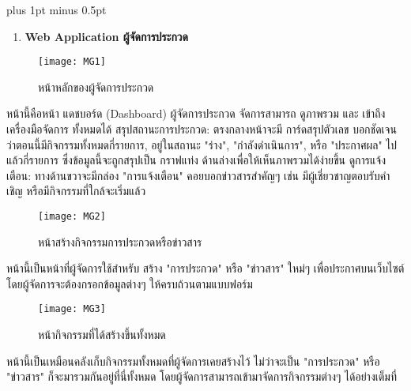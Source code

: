
\clearpage
\thispagestyle{plain}

\begingroup
\fontsize{16pt}{19.2pt}\selectfont
\justifying
\XeTeXlinebreakskip=0pt plus 1pt minus 0.5pt
\setlength{\parindent}{1.5cm}
\setlength{\parskip}{0pt}

\begin{sloppypar}
	\begin{enumerate}[start=4]  %
		\item \textbf{Web Application ผู้จัดการประกวด}
	\end{enumerate}
\end{sloppypar}

\begin{figure}[h]
	\centering
	\texttt{[image: MG1]}
	\caption{หน้าหลักของผู้จัดการประกวด}
\end{figure}

\indent หน้านี้คือหน้า แดชบอร์ด (Dashboard) ผู้จัดการประกวด จัดการสามารถ ดูภาพรวม และ เข้าถึงเครื่องมือจัดการ ทั้งหมดได้ สรุปสถานะการประกวด: ตรงกลางหน้าจะมี การ์ดสรุปตัวเลข บอกชัดเจนว่าตอนนี้มีกิจกรรมทั้งหมดกี่รายการ, อยู่ในสถานะ "ร่าง", "กำลังดำเนินการ", หรือ "ประกาศผล" ไปแล้วกี่รายการ ซึ่งข้อมูลนี้จะถูกสรุปเป็น กราฟแท่ง ด้านล่างเพื่อให้เห็นภาพรวมได้ง่ายขึ้น ดูการแจ้งเตือน: ทางด้านขวาจะมีกล่อง "การแจ้งเตือน" คอยบอกข่าวสารสำคัญๆ เช่น มีผู้เชี่ยวชาญตอบรับคำเชิญ หรือมีกิจกรรมที่ใกล้จะเริ่มแล้ว

\vspace{\baselineskip}

\begin{figure}[h]
	\centering
	\texttt{[image: MG2]}
	\caption{หน้าสร้างกิจกรรมการประกวดหรือข่าวสาร}
\end{figure}

\indent หน้านี้เป็นหน้าที่ผู้จัดการใช้สำหรับ สร้าง "การประกวด" หรือ "ข่าวสาร" ใหม่ๆ เพื่อประกาศบนเว็บไซต์ โดยผู้จัดการจะต้องกรอกข้อมูลต่างๆ ให้ครบถ้วนตามแบบฟอร์ม

\newpage

\begin{figure}[h]
	\centering
	\texttt{[image: MG3]}
	\caption{หน้ากิจกรรมที่ได้สร้างขึ้นทั้งหมด}
\end{figure}

\indent หน้านี้เป็นเหมือนคลังเก็บกิจกรรมทั้งหมดที่ผู้จัดการเคยสร้างไว้ ไม่ว่าจะเป็น "การประกวด" หรือ "ข่าวสาร" ก็จะมารวมกันอยู่ที่นี่ทั้งหมด โดยผู้จัดการสามารถเข้ามาจัดการกิจกรรมต่างๆ ได้อย่างเต็มที่

